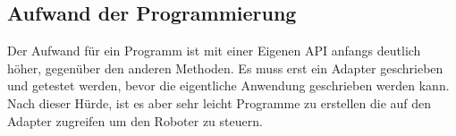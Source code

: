 \subsection{Aufwand der Programmierung}
\label{eigene_api_aufwand}

Der Aufwand für ein Programm ist mit einer Eigenen API anfangs deutlich höher, gegenüber den anderen Methoden. Es muss erst ein Adapter geschrieben und getestet werden, bevor die eigentliche Anwendung geschrieben werden kann. 
Nach dieser Hürde, ist es aber sehr leicht Programme zu erstellen die auf den Adapter zugreifen um den Roboter zu steuern.